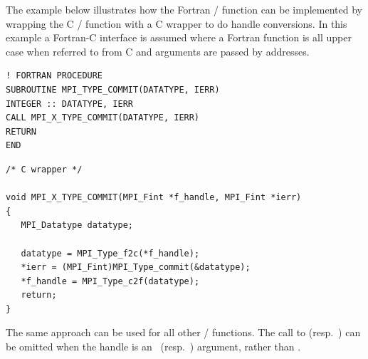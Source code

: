 %

%

%

%

\bindingislistfalse
{}%

\begin{example}
The example below illustrates how the Fortran \MPI/ function
 can be implemented by wrapping the C \MPI/
function  with a C wrapper to do handle
conversions.
In this example a Fortran-C interface is assumed where a Fortran function is
all upper case when referred to from C and arguments are passed by addresses.

%
%
\begin{lstlisting}[language={[MPI]Fortran}]
! FORTRAN PROCEDURE
SUBROUTINE MPI_TYPE_COMMIT(DATATYPE, IERR)
INTEGER :: DATATYPE, IERR
CALL MPI_X_TYPE_COMMIT(DATATYPE, IERR)
RETURN
END
\end{lstlisting}

\begin{lstlisting}[language={[MPI]C}]
/* C wrapper */

void MPI_X_TYPE_COMMIT(MPI_Fint *f_handle, MPI_Fint *ierr)
{
   MPI_Datatype datatype;

   datatype = MPI_Type_f2c(*f_handle);
   *ierr = (MPI_Fint)MPI_Type_commit(&datatype);
   *f_handle = MPI_Type_c2f(datatype);
   return;
}
\end{lstlisting}

The same approach can be used for all other \MPI/ functions.
The call to  (resp.\ )
can be
omitted when the handle is an \OUT\ (resp.\ \IN) argument, rather than
\INOUT.
\end{example}


